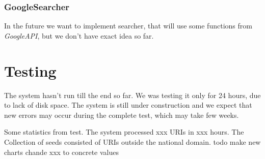 \documentclass[11pt,a4paper]{article}
\begin{document}
\subsubsection*{GoogleSearcher}
In the future we want to implement searcher, that will use some functions from \emph{GoogleAPI}, but we don't have exact idea so far.


\newpage
\section{Testing}

The system hasn't run till the end so far. We was testing it only for 24 hours, due to lack of disk space. The system is still under construction and we expect that new errors may occur during the complete test, which may take few weeks.

Some statistics from test. The system processed xxx URIs in xxx hours. The Collection of seeds consisted of URIs outside the national domain.
todo make new charts chande xxx to concrete values
\end{document}
